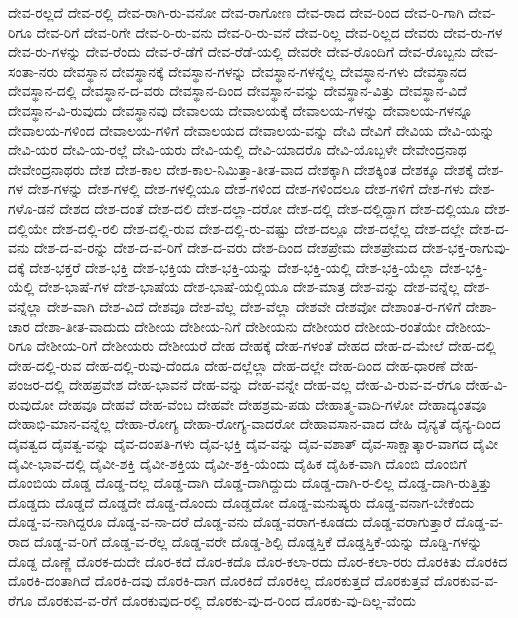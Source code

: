 {ದೇವ-ರಲ್ಲದೆ
ದೇವ-ರಲ್ಲಿ
ದೇವ-ರಾಗಿ-ರು-ವನೋ
ದೇವ-ರಾಗೋಣ
ದೇವ-ರಾದ
ದೇವ-ರಿಂದ
ದೇವ-ರಿ-ಗಾಗಿ
ದೇವ-ರಿಗೂ
ದೇವ-ರಿಗೆ
ದೇವ-ರಿಗೇ
ದೇವ-ರಿ-ರು-ವನು
ದೇವ-ರಿ-ರು-ವನೆ
ದೇವ-ರಿಲ್ಲ
ದೇವ-ರಿಲ್ಲದ
ದೇವರು
ದೇವ-ರು-ಗಳ
ದೇವ-ರು-ಗಳನ್ನು
ದೇವ-ರೆಂದು
ದೇವ-ರೆ-ಡೆಗೆ
ದೇವ-ರೆಡೆ-ಯಲ್ಲಿ
ದೇವರೇ
ದೇವ-ರೊಂದಿಗೆ
ದೇವ-ರೊಬ್ಬನು
ದೇವ-ಸಂತಾ-ನರು
ದೇವಸ್ಥಾನ
ದೇವಸ್ಥಾನಕ್ಕೆ
ದೇವಸ್ಥಾನ-ಗಳನ್ನು
ದೇವಸ್ಥಾನ-ಗಳನ್ನೆಲ್ಲ
ದೇವಸ್ಥಾನ-ಗಳು
ದೇವಸ್ಥಾನದ
ದೇವಸ್ಥಾನ-ದಲ್ಲಿ
ದೇವಸ್ಥಾನ-ದ-ವರು
ದೇವಸ್ಥಾನ-ದಿಂದ
ದೇವಸ್ಥಾನ-ವನ್ನು
ದೇವಸ್ಥಾನ-ವಿತ್ತು
ದೇವಸ್ಥಾನ-ವಿದೆ
ದೇವಸ್ಥಾನ-ವಿ-ರುವುದು
ದೇವಸ್ಥಾನವು
ದೇವಾಲಯ
ದೇವಾಲಯಕ್ಕೆ
ದೇವಾಲಯ-ಗಳನ್ನು
ದೇವಾಲಯ-ಗಳನ್ನೂ
ದೇವಾಲಯ-ಗಳಿಂದ
ದೇವಾಲಯ-ಗಳಿಗೆ
ದೇವಾಲಯದ
ದೇವಾಲಯ-ವನ್ನು
ದೇವಿ
ದೇವಿಗೆ
ದೇವಿಯ
ದೇವಿ-ಯನ್ನು
ದೇವಿ-ಯರ
ದೇವಿ-ಯ-ರಲ್ಲೆ
ದೇವಿ-ಯರು
ದೇವಿ-ಯಲ್ಲಿ
ದೇವಿ-ಯಾದರೊ
ದೇವಿ-ಯೊಬ್ಬಳೇ
ದೇವೇಂದ್ರನಾಥ
ದೇವೇಂದ್ರನಾಥರು
ದೇಶ
ದೇಶ-ಕಾಲ
ದೇಶ-ಕಾಲ-ನಿಮಿತ್ತಾ-ತೀತ-ವಾದ
ದೇಶಕ್ಕಾಗಿ
ದೇಶಕ್ಕಿಂತ
ದೇಶಕ್ಕೂ
ದೇಶಕ್ಕೆ
ದೇಶ-ಗಳ
ದೇಶ-ಗಳನ್ನು
ದೇಶ-ಗಳಲ್ಲಿ
ದೇಶ-ಗಳಲ್ಲಿಯೂ
ದೇಶ-ಗಳಿಂದ
ದೇಶ-ಗಳಿಂದಲೂ
ದೇಶ-ಗಳಿಗೆ
ದೇಶ-ಗಳು
ದೇಶ-ಗಳೊ-ಡನೆ
ದೇಶದ
ದೇಶ-ದಂತೆ
ದೇಶ-ದಲಿ
ದೇಶ-ದಲ್ಲಾ-ದರೋ
ದೇಶ-ದಲ್ಲಿ
ದೇಶ-ದಲ್ಲಿದ್ದಾಗ
ದೇಶ-ದಲ್ಲಿಯೂ
ದೇಶ-ದಲ್ಲಿಯೇ
ದೇಶ-ದಲ್ಲಿ-ರಲಿ
ದೇಶ-ದಲ್ಲಿ-ರುವ
ದೇಶ-ದಲ್ಲಿ-ರು-ವಷ್ಟು
ದೇಶ-ದಲ್ಲೂ
ದೇಶ-ದಲ್ಲೆಲ್ಲ
ದೇಶ-ದಲ್ಲೇ
ದೇಶ-ದ-ವನು
ದೇಶ-ದ-ವ-ರನ್ನು
ದೇಶ-ದ-ವ-ರಿಗೆ
ದೇಶ-ದ-ವರು
ದೇಶ-ದಿಂದ
ದೇಶಪ್ರೇಮ
ದೇಶಪ್ರೇಮದ
ದೇಶ-ಭಕ್ತ-ರಾಗುವು-ದಕ್ಕೆ
ದೇಶ-ಭಕ್ತರೆ
ದೇಶ-ಭಕ್ತಿ
ದೇಶ-ಭಕ್ತಿಯ
ದೇಶ-ಭಕ್ತಿ-ಯನ್ನು
ದೇಶ-ಭಕ್ತಿ-ಯಲ್ಲಿ
ದೇಶ-ಭಕ್ತಿ-ಯೆಲ್ಲಾ
ದೇಶ-ಭಕ್ತಿ-ಯೆಲ್ಲಿ
ದೇಶ-ಭಾಷೆ-ಗಳ
ದೇಶ-ಭಾಷೆಯ
ದೇಶ-ಭಾಷೆ-ಯಲ್ಲಿಯೂ
ದೇಶ-ಮಾತ್ರ
ದೇಶ-ವನ್ನು
ದೇಶ-ವನ್ನೆಲ್ಲ
ದೇಶ-ವನ್ನೆಲ್ಲಾ
ದೇಶ-ವಾಗಿ
ದೇಶ-ವಿದೆ
ದೇಶವೂ
ದೇಶ-ವೆಲ್ಲ
ದೇಶ-ವೆಲ್ಲಾ
ದೇಶವೇ
ದೇಶವೋ
ದೇಶಾಂತ-ರ-ಗಳಿಗೆ
ದೇಶಾ-ಚಾರ
ದೇಶಾ-ತೀತ-ವಾದುದು
ದೇಶೀಯ
ದೇಶೀಯ-ನಿಗೆ
ದೇಶೀಯನು
ದೇಶೀಯರ
ದೇಶೀಯ-ರಂತೆಯೇ
ದೇಶೀಯ-ರಿಗೂ
ದೇಶೀಯ-ರಿಗೆ
ದೇಶೀಯರು
ದೇಶೀಯರೆ
ದೇಹ
ದೇಹಕ್ಕೆ
ದೇಹ-ಗಳಂತೆ
ದೇಹದ
ದೇಹ-ದ-ಮೇಲೆ
ದೇಹ-ದಲ್ಲಿ
ದೇಹ-ದಲ್ಲಿ-ರುವ
ದೇಹ-ದಲ್ಲಿ-ರುವು-ದೆಂದೂ
ದೇಹ-ದಲ್ಲೆಲ್ಲಾ
ದೇಹ-ದಲ್ಲೇ
ದೇಹ-ದಿಂದ
ದೇಹ-ಧಾರಣೆ
ದೇಹ-ಪಂಜರ-ದಲ್ಲಿ
ದೇಹಪ್ರವೇಶ
ದೇಹ-ಭಾವನೆ
ದೇಹ-ವನ್ನು
ದೇಹ-ವನ್ನೇ
ದೇಹ-ವಲ್ಲ
ದೇಹ-ವಿ-ರುವ-ವ-ರೆಗೂ
ದೇಹ-ವಿ-ರುವುದೋ
ದೇಹವೂ
ದೇಹವೆ
ದೇಹ-ವೆಂಬ
ದೇಹವೇ
ದೇಹಶ್ರಮ-ಪಡು
ದೇಹಾತ್ಮ-ವಾದಿ-ಗಳೋ
ದೇಹಾದ್ಯಂತವೂ
ದೇಹಾಭಿ-ಮಾನ-ವನ್ನೆಲ್ಲ
ದೇಹಾ-ರೋಗ್ಯ
ದೇಹಾ-ರೋಗ್ಯ-ವಾದರೋ
ದೇಹಾವಸಾನ-ವಾದ
ದೇಹಿ
ದೈನ್ಯತೆ
ದೈನ್ಯ-ದಿಂದ
ದೈವತ್ವದ
ದೈವತ್ವ-ವನ್ನು
ದೈವ-ದಂಪತಿ-ಗಳು
ದೈವ-ಭಕ್ತಿ
ದೈವ-ವನ್ನು
ದೈವ-ವಶಾತ್
ದೈವ-ಸಾಕ್ಷಾತ್ಕಾರ-ವಾಗದ
ದೈವೀ
ದೈವೀ-ಭಾವ-ದಲ್ಲಿ
ದೈವೀ-ಶಕ್ತಿ
ದೈವೀ-ಶಕ್ತಿಯ
ದೈವೀ-ಶಕ್ತಿ-ಯೆಂದು
ದೈಹಿಕ
ದೈಹಿಕ-ವಾಗಿ
ದೊಂಬಿ
ದೊಂಬಿಗೆ
ದೊಂಬಿಯ
ದೊಡ್ಡ
ದೊಡ್ಡ-ದಲ್ಲ
ದೊಡ್ಡ-ದಾಗಿ
ದೊಡ್ಡ-ದಾಗಿದ್ದುದು
ದೊಡ್ಡ-ದಾಗಿ-ರ-ಲಿಲ್ಲ
ದೊಡ್ಡ-ದಾಗಿ-ರುತ್ತಿತ್ತು
ದೊಡ್ಡದು
ದೊಡ್ಡದೆ
ದೊಡ್ಡದೇ
ದೊಡ್ಡ-ದೊಂದು
ದೊಡ್ಡದೋ
ದೊಡ್ಡ-ಮನುಷ್ಯರು
ದೊಡ್ಡ-ವನಾಗ-ಬೇಕೆಂದು
ದೊಡ್ಡ-ವ-ನಾಗಿದ್ದರೂ
ದೊಡ್ಡ-ವ-ನಾ-ದರೆ
ದೊಡ್ಡ-ವನು
ದೊಡ್ಡ-ವರಾಗ-ಕೂಡದು
ದೊಡ್ಡ-ವರಾಗುತ್ತಾರೆ
ದೊಡ್ಡ-ವ-ರಾದ
ದೊಡ್ಡ-ವ-ರಿಗೆ
ದೊಡ್ಡ-ವ-ರೆಲ್ಲ
ದೊಡ್ಡ-ವರೇ
ದೊಡ್ಡ-ಶಿಲ್ಪಿ
ದೊಡ್ಡಸ್ತಿಕೆ
ದೊಡ್ಡಸ್ತಿಕೆ-ಯನ್ನು
ದೊಡ್ಡಿ-ಗಳನ್ನು
ದೊಡ್ದ
ದೊಣ್ಣೆ
ದೊರಕ-ದುದೇ
ದೊರ-ಕದೆ
ದೊರ-ಕದೊ
ದೊರ-ಕಲಾ-ರದು
ದೊರ-ಕಲಾ-ರರು
ದೊರಕಿತು
ದೊರಕಿದ
ದೊರಕಿ-ದಂತಾಗಿದೆ
ದೊರಕಿ-ದವು
ದೊರಕಿ-ದಾಗ
ದೊರಕಿದೆ
ದೊರಕಿಲ್ಲ
ದೊರಕುತ್ತದೆ
ದೊರಕುತ್ತವೆ
ದೊರಕುವ-ವ-ರೆಗೂ
ದೊರಕುವ-ವ-ರೆಗೆ
ದೊರಕುವುದ-ರಲ್ಲಿ
ದೊರಕು-ವು-ದ-ರಿಂದ
ದೊರಕು-ವು-ದಿಲ್ಲ-ವೆಂದು
}
